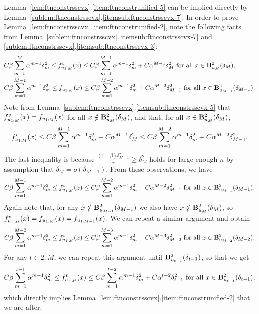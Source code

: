 Lemma~\ref{lem:ftnconstrsscvx}.\ref{item:ftnconstrunified-5} can be implied directly by Lemma~\ref{sublem:ftnconstrsscvx}.\ref{itemsub:ftnconstrsscvx-7}.
In order to prove Lemma~\ref{lem:ftnconstrsscvx}.\ref{item:ftnconstrunified-2}, note the following facts from Lemma~\ref{sublem:ftnconstrsscvx}.\ref{itemsub:ftnconstrsscvx-7} and \ref{sublem:ftnconstrsscvx}.\ref{itemsub:ftnconstrsscvx-3}:
\begin{align*}
	&C \beta \sum_{m=1}^{M} \alpha^{m-1}\delta_m^2
	\leq
	f_{u_{1:M}}^v (x)
	\leq
	C \beta \sum_{m=1}^{M-1} \alpha^{m-1}\delta_m^2 + C \alpha^{M-1} \delta_{M}^2
	\text{ for all } x \in \mathbf{B}^2_{u_{M}}({\delta_{M}}),\\
	&C \beta \sum_{m=1}^{M-1} \alpha^{m-1}\delta_m^2 
	\leq
	f_{u_{1:{M}}} (x)
	\leq
	C \beta \sum_{m=1}^{M-2} \alpha^{m-1}\delta_m^2 + C \alpha^{M-2} \delta_{M-1}^2
	\text{ for all } x \in \mathbf{B}^2_{u_{M-1}}({\delta_{M-1}}).
\end{align*}
Note from Lemma~\ref{sublem:ftnconstrsscvx}.\ref{itemsub:ftnconstrsscvx-5} that $f_{u_{1:M}}^v (x) = f_{u_{1:{M}}}(x)$ for all $x \notin \mathbf{B}^2_{u_{M}}({\delta_{M}})$, 
and that, for all $x \in \mathbf{B}^2_{u_{M}}({\delta_{M}})$,
\begin{equation*}
	f_{u_{1:M}}^v (x)
	\leq
	C \beta \sum_{m=1}^{M-1} \alpha^{m-1}\delta_m^2 + C \alpha^{M-1} \delta_{M}^2
	\leq
	C \beta \sum_{m=1}^{M-2} \alpha^{m-1}\delta_m^2 + C \alpha^{M-2} \delta_{M-1}^2.
\end{equation*}
The last inequality is because $\frac{(1-\beta)\delta_{M-1}^2}{\alpha} \geq \delta_M^2$ holds for large enough $n$ by assumption
that $\delta_M = o(\delta_{M-1})$.
From these observations, we have
\begin{align*}
	C \beta \sum_{m=1}^{M-1} \alpha^{m-1}\delta_m^2
	\leq
	f_{u_{1:M}}^v (x)
	\leq
	C \beta \sum_{m=1}^{M-2} \alpha^{m-1}\delta_m^2 + C \alpha^{M-2} \delta_{M-1}^2
	\text{ for all } x \in \mathbf{B}^2_{u_{M-1}}({\delta_{M-1}}).
\end{align*}
Again note that, for any $x \notin \mathbf{B}^2_{u_{M-1}}({\delta_{M-1}})$ we also have $x \notin \mathbf{B}^2_{u_{M}}({\delta_{M}})$, 
so $f_{u_{1:M}}^v(x) = f_{u_{1:{M}}}(x) = f_{u_{1:{M-1}}}(x)$. We can repeat a similar argument and obtain
\begin{align*}
	C \beta \sum_{m=1}^{M-2} \alpha^{m-1}\delta_m^2
	\leq
	f_{u_{1:M}}^v (x)
	\leq
	C \beta \sum_{m=1}^{M-3} \alpha^{m-1}\delta_m^2 + C \alpha^{M-3} \delta_{M-2}^2
	\text{ for all } x \in \mathbf{B}^2_{u_{M-2}}({\delta_{M-2}}).
\end{align*}
For any $t \in 2:M$, we can repeat this argument until $\mathbf{B}^2_{u_{t-1}}({\delta_{t-1}})$, so that we get
\begin{align*}
	C \beta \sum_{m=1}^{t-1} \alpha^{m-1}\delta_m^2
	\leq
	f_{u_{1:M}}^v (x)
	\leq
	C \beta \sum_{m=1}^{t-2} \alpha^{m-1}\delta_m^2 + C \alpha^{t-2} \delta_{t-1}^2
	\text{ for all } x \in \mathbf{B}^2_{u_{t-1}}({\delta_{t-1}}),
\end{align*}
which directly implies Lemma~\ref{lem:ftnconstrsscvx}.\ref{item:ftnconstrunified-2} that we are after.

